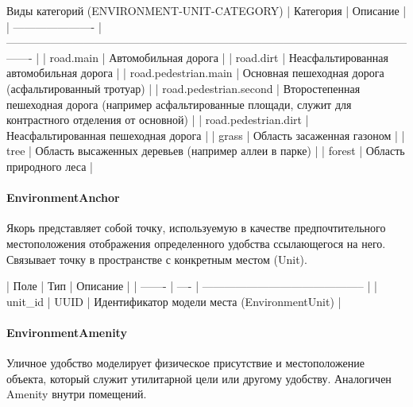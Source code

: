         Виды категорий (ENVIRONMENT-UNIT-CATEGORY)
        | Категория              | Описание                                                                                                            |
        | ---------------------- | ------------------------------------------------------------------------------------------------------------------- |
        | road.main              | Автомобильная дорога                                                                                                |
        | road.dirt              | Неасфальтированная автомобильная дорога                                                                             |
        | road.pedestrian.main   | Основная пешеходная дорога (асфальтированный тротуар)                                                               |
        | road.pedestrian.second | Второстепенная пешеходная дорога (например асфальтированные площади, служит для контрастного отделения от основной) |
        | road.pedestrian.dirt   | Неасфальтированная  пешеходная дорога                                                                               |
        | grass                  | Область засаженная газоном                                                                                          |
        | tree                   | Область высаженных деревьев (например аллеи в парке)                                                                |
        | forest                 | Область природного леса                                                                                             |

      \paragraph{EnvironmentAnchor}

        Якорь представляет собой точку, используемую в качестве предпочтительного местоположения отображения определенного удобства ссылающегося на него. Связывает точку в пространстве с конкретным местом (Unit).

        | Поле    | Тип  | Описание                                     |
        | ------- | ---- | -------------------------------------------- |
        | unit\_id | UUID | Идентификатор модели места (EnvironmentUnit) |


      \paragraph{EnvironmentAmenity}
        Уличное удобство моделирует физическое присутствие и местоположение объекта, который служит утилитарной цели или другому удобству. Аналогичен Amenity внутри помещений.

